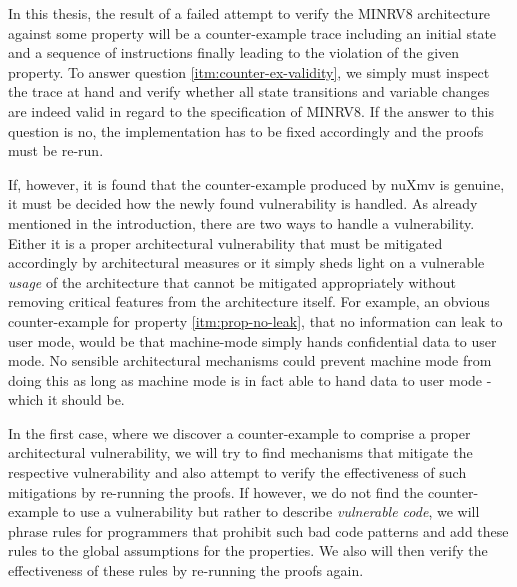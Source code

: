 In this thesis, the result of a failed attempt to verify the MINRV8 architecture against some property will be a counter-example trace including an initial state and a sequence of instructions finally leading to the violation of the given property.
To answer question \ref{itm:counter-ex-validity}, we simply must inspect the trace at hand and verify whether all state transitions and variable changes are indeed valid in regard to the specification of MINRV8.
If the answer to this question is no, the implementation has to be fixed accordingly and the proofs must be re-run.

If, however, it is found that the counter-example produced by nuXmv is genuine, it must be decided how the newly found vulnerability is handled.
As already mentioned in the introduction, there are two ways to handle a vulnerability.
Either it is a proper architectural vulnerability that must be mitigated accordingly by architectural measures or it simply sheds light on a vulnerable \textit{usage} of the architecture that cannot be mitigated appropriately without removing critical features from the architecture itself.
For example, an obvious counter-example for property \ref{itm:prop-no-leak}, that no information can leak to user mode, would be that machine-mode simply hands confidential data to user mode.
No sensible architectural mechanisms could prevent machine mode from doing this as long as machine mode is in fact able to hand data to user mode - which it should be.

In the first case, where we discover a counter-example to comprise a proper architectural vulnerability, we will try to find mechanisms that mitigate the respective vulnerability and also attempt to verify the effectiveness of such mitigations by re-running the proofs.
If however, we do not find the counter-example to use a vulnerability but rather to describe \textit{vulnerable code}, we will phrase rules for programmers that prohibit such bad code patterns and add these rules to the global assumptions for the properties.
We also will then verify the effectiveness of these rules by re-running the proofs again.

